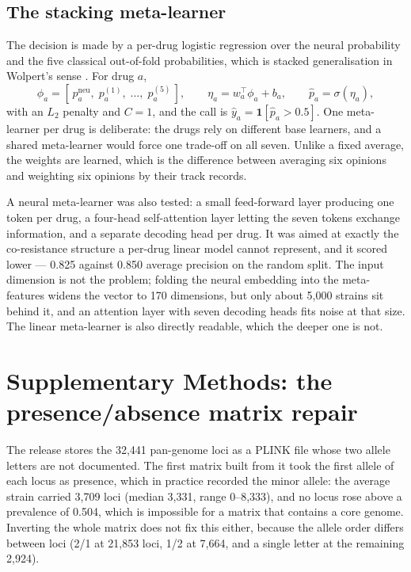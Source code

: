 \documentclass[11pt]{article}
\begin{document}
\subsection{The stacking meta-learner}
The decision is made by a per-drug logistic regression over the neural probability and the five
classical out-of-fold probabilities, which is stacked generalisation in Wolpert's sense
\cite{wolpert1992stacked}. For drug $a$,
\begin{equation}
\phi_a = \left[\,p^{\mathrm{neu}}_a,\; p^{(1)}_a,\; \dots,\; p^{(5)}_a\,\right],
\qquad
\eta_a = w_a^\top \phi_a + b_a,
\qquad
\hat{p}_a = \sigma(\eta_a),
\label{eq:meta}
\end{equation}
with an $L_2$ penalty and $C = 1$, and the call is $\hat{y}_a = \mathbf{1}[\hat{p}_a > 0.5]$. One
meta-learner per drug is deliberate: the drugs rely on different base learners, and a shared
meta-learner would force one trade-off on all seven. Unlike a fixed average, the weights are
learned, which is the difference between averaging six opinions and weighting six opinions by their
track records.

A neural meta-learner was also tested: a small feed-forward layer producing one token per drug, a
four-head self-attention layer letting the seven tokens exchange information, and a separate
decoding head per drug. It was aimed at exactly the co-resistance structure a per-drug linear model
cannot represent, and it scored lower --- 0.825 against 0.850 average precision on the random split.
The input dimension is not the problem; folding the neural embedding into the meta-features widens
the vector to 170 dimensions, but only about 5,000 strains sit behind it, and an attention layer
with seven decoding heads fits noise at that size. The linear meta-learner is also directly
readable, which the deeper one is not.

\section{Supplementary Methods: the presence/absence matrix repair}

The release stores the 32,441 pan-genome loci as a PLINK file whose two allele letters are not
documented. The first matrix built from it took the first allele of each locus as presence, which in
practice recorded the minor allele: the average strain carried 3,709 loci (median 3,331, range
0--8,333), and no locus rose above a prevalence of 0.504, which is impossible for a matrix that
contains a core genome. Inverting the whole matrix does not fix this either, because the allele order
differs between loci (2/1 at 21,853 loci, 1/2 at 7,664, and a single letter at the remaining 2,924).
\end{document}

